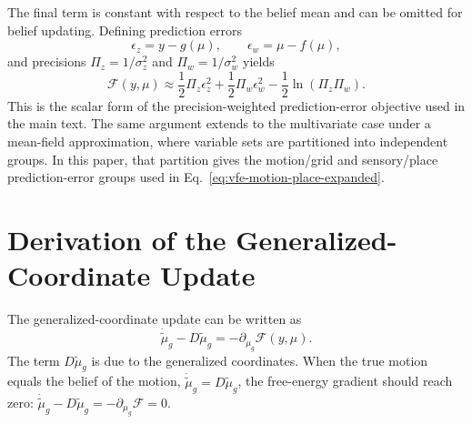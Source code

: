 The final term is constant with respect to the belief mean and can be omitted for belief updating. Defining prediction errors
\begin{equation}
    \epsilon_z = y-g(\mu),
    \qquad
    \epsilon_w = \mu-f(\mu),
\end{equation}
and precisions $\Pi_z=1/\sigma_z^2$ and $\Pi_w=1/\sigma_w^2$ yields
\begin{equation}
    \mathcal{F}(y,\mu)
    \approx
    \frac{1}{2}\Pi_z\epsilon_z^2
    +
    \frac{1}{2}\Pi_w\epsilon_w^2
    -
    \frac{1}{2}\ln\left(\Pi_z\Pi_w\right).
\end{equation}
This is the scalar form of the precision-weighted prediction-error objective used in the main text.
The same argument extends to the multivariate case under a mean-field approximation, where variable sets are partitioned into independent groups. In this paper, that partition gives the motion/grid and sensory/place prediction-error groups used in Eq.~\ref{eq:vfe-motion-place-expanded}.

\section{Derivation of the Generalized-Coordinate Update}
\label{app:slide15-update-derivation}

The generalized-coordinate update can be written as
\begin{equation}
    \dot{\tilde{\mu}}_{g}
    -
    D\tilde{\mu}_{g}
    =
    -
    \partial_{\mu_g}\mathcal{F}(y,\mu).
    \label{eq:appendix-slide15-gradient-balance}
\end{equation}
The term $D\tilde{\mu}_{g}$ is due to the generalized coordinates. When the true motion equals the belief of the motion, $\dot{\tilde{\mu}}_{g}=D\tilde{\mu}_{g}$, the free-energy gradient should reach zero: $\dot{\tilde{\mu}}_{g}-D\tilde{\mu}_{g}=-\partial_{\mu_g}\mathcal{F}=0$.

